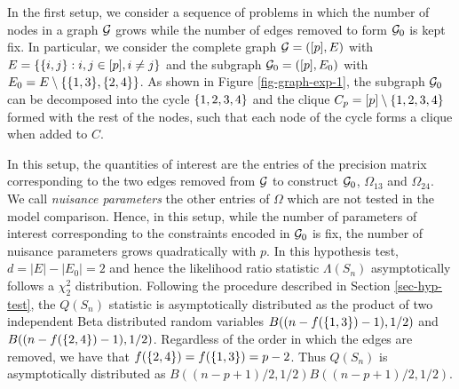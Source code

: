 In the first setup, we consider a sequence of problems in which the number of nodes in a graph ${\mathcal{G}}$ grows while the number of edges removed to form ${\mathcal{G}}_0$ is kept fix. In particular, we  consider the complete graph ${\mathcal{G}} = ([p], E)$ with $E = {\left\{{\left\{i, j\right\}} : i, j \in [p], i \neq j\right\}}$ and the subgraph ${\mathcal{G}}_0 = ([p], E_0)$ with $E_0 = E \setminus {\left\{{\left\{1, 3\right\}}, {\left\{2, 4\right\}}\right\}}$. As shown in Figure \ref{fig-graph-exp-1}, the subgraph ${\mathcal{G}}_0$ can be decomposed into the cycle ${\left\{1, 2, 3, 4\right\}}$ and the clique $C_p = [p] \setminus {\left\{1,2,3,4\right\}}$ formed with the rest of the nodes, such that each node of the cycle forms a clique when added to $C$. 

In this setup, the quantities of interest are the entries of the precision matrix corresponding to the two edges removed from ${\mathcal{G}}$ to construct ${\mathcal{G}}_0$, $\Omega_{13}$ and $\Omega_{24}$. We call \textit{nuisance parameters} the other entries of $\Omega$ which are not tested in the model comparison. Hence, in this setup, while the number of parameters of interest corresponding to the constraints encoded in ${\mathcal{G}}_0$ is fix, the number of nuisance parameters grows quadratically with $p$.  In this hypothesis test, $d = |E| - |E_0| = 2$ and hence the likelihood ratio statistic $\Lambda(S_n)$ asymptotically follows a $\chi^2_2$ distribution. Following the procedure described in Section \ref{sec-hyp-test}, the $Q(S_n)$ statistic is asymptotically distributed as the product of two independent Beta distributed random variables $B((n - f({\left\{1,3\right\}}) - 1), 1/2)$ and $B((n - f({\left\{2,4\right\}}) - 1), 1/2)$. Regardless of the order in which the edges are removed, we have that $f({\left\{2,4\right\}}) = f({\left\{1, 3\right\}}) = p - 2$. Thus $Q(S_n)$ is asymptotically distributed as $B((n-p+1)/2, 1/2)B((n-p+1)/2, 1/2)$.



